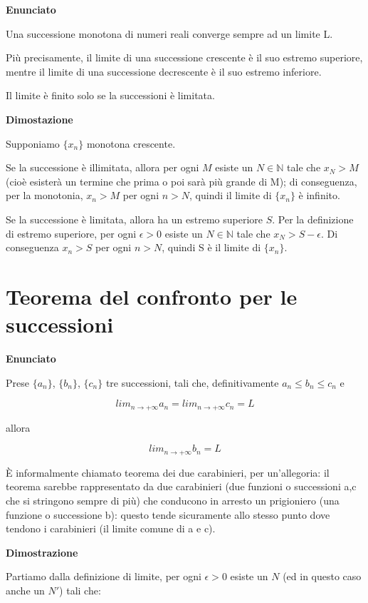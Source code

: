 \textbf{Enunciato}

Una successione monotona di numeri reali converge sempre ad un limite L.

Più precisamente, il limite di una successione crescente è il suo estremo superiore, mentre il limite di una successione decrescente è il suo estremo inferiore.

Il limite è finito solo se la successioni è limitata.

\textbf{Dimostazione}

Supponiamo $\{x_{n}\}$ monotona crescente.

Se la successione è illimitata, allora per ogni $M$ esiste un $N \in \mathbb{N}$ tale che $x_{N} > M$ (cioè esisterà un termine che prima o poi sarà più grande di M); di conseguenza, per la monotonia, $x_{n} > M$ per ogni $n > N$, quindi il limite di $\{x_{n}\}$ è infinito.

Se la successione è limitata, allora ha un estremo superiore $S$. Per la definizione di estremo superiore, per ogni $\epsilon > 0$ esiste un $N \in \mathbb{N}$ tale che $x_{N} > S - \epsilon$. Di conseguenza $x_{n} > S$ per ogni $n > N$, quindi S è il limite di $\{x_{n}\}$.

\section{Teorema del confronto per le successioni}

\textbf{Enunciato}

Prese $\{a_{n}\}$, $\{b_{n}\}$, $\{c_{n}\}$ tre successioni, tali che, definitivamente $a_{n} \leq b_{n} \leq c_{n}$ e 

$$lim_{n \to +\infty} a_{n} = lim_{n \to +\infty} c_{n} = L$$ 

allora 

$$lim_{n \to +\infty} b_{n} = L$$

\begin{tip}
È informalmente chiamato teorema dei due carabinieri, per un'allegoria: il teorema sarebbe rappresentato da due carabinieri (due funzioni o successioni a,c che si stringono sempre di più) che conducono in arresto un prigioniero (una funzione o successione b): questo tende sicuramente allo stesso punto dove tendono i carabinieri (il limite comune di a e c).
\end{tip}

\textbf{Dimostrazione}

Partiamo dalla definizione di limite, per ogni $\epsilon > 0$ esiste un $N$ (ed in questo caso anche un $N'$) tali che:

